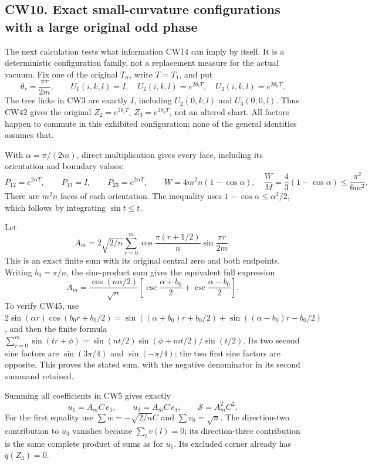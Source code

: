 \documentclass[11pt]{article}
\begin{document}
\subsection*{CW10. Exact small-curvature configurations with a large original odd phase}

The next calculation tests what information CW14 can imply by
itself. It is a deterministic configuration family, not a
replacement measure for the actual vacuum. Fix one of the
original \(T_\alpha\), write \(T=T_1\), and put
\[
 \theta_r=\frac{\pi r}{2m},\qquad
 U_1(i,k,l)=I,\quad
 U_2(i,k,l)=e^{2\theta_iT},\quad
 U_3(i,k,l)=e^{2\theta_kT}.                               \tag{CW42}
\]
The tree links in CW3 are exactly \(I\), including
\(U_2(0,k,l)\) and \(U_3(0,0,l)\). Thus CW42 gives the original
\(Z_2=e^{2\theta_iT}\), \(Z_3=e^{2\theta_kT}\), not an
altered chart. All factors happen to commute in this exhibited
configuration; none of the general identities assumes that.

With \(\alpha=\pi/(2m)\), direct multiplication gives every
face, including its orientation and boundary values:
\[
 P_{12}=e^{2\alpha T},\qquad P_{13}=I,\qquad
 P_{23}=e^{2\alpha T},\qquad
 W=4m^2n(1-\cos\alpha),\quad
 \frac WM=\frac43(1-\cos\alpha)\le\frac{\pi^2}{6m^2}.
                                                               \tag{CW43}
\]
There are \(m^2n\) faces of each orientation. The inequality
uses \(1-\cos\alpha\le\alpha^2/2\), which follows by
integrating \(\sin t\le t\).

Let
\[
 A_m=2\sqrt{2/n}\sum_{r=0}^m
 \cos\frac{\pi(r+1/2)}n\sin\frac{\pi r}{2m}.
                                                               \tag{CW44}
\]
This is an exact finite sum with its original central zero and
both endpoints. Writing \(b_0=\pi/n\), the sine-product sum gives
the equivalent full expression
\[
 A_m=\frac{\cos(n\alpha/2)}{\sqrt n}
 \left[\csc\frac{\alpha+b_0}{2}
       +\csc\frac{\alpha-b_0}{2}\right].                 \tag{CW45}
\]
To verify CW45, use
\(2\sin(\alpha r)\cos(b_0r+b_0/2)
=\sin((\alpha+b_0)r+b_0/2)
+\sin((\alpha-b_0)r-b_0/2)\), and then the finite formula
\(\sum_{r=0}^m\sin(tr+\phi)
=\sin(nt/2)\sin(\phi+mt/2)/\sin(t/2)\).
Its two second sine factors are \(\sin(3\pi/4)\) and
\(\sin(-\pi/4)\); the two first sine factors are opposite.
This proves the stated sum, with the negative denominator in
its second summand retained.

Summing all coefficients in CW5 gives exactly
\[
 u_1=A_mC\,e_1,\qquad u_3=A_mC\,e_1,\qquad
 \mathcal S=A_m^2C^2.                                     \tag{CW46}
\]
For the first equality use \(\sum w=-\sqrt{2/n}C\) and
\(\sum v_0=\sqrt n\). The direction-two contribution to
\(u_3\) vanishes because \(\sum_l v(l)=0\); its direction-three
contribution is the same complete product of sums as for \(u_1\).
Its excluded corner already has \(q(Z_3)=0\).
\end{document}
